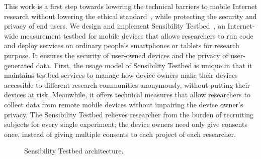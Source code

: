 This work is a first step towards lowering the technical
barriers to mobile Internet research without lowering the
ethical standard~\cite{zevenbergen2013ethical}, while 
protecting the security and privacy of end users. We design 
and implement Sensibility Testbed~\cite{sensibility, 
zhuang2014sensibility}, an Internet-wide measurement testbed for mobile devices that
allows researchers to run code and deploy services on ordinary
people's smartphones or tablets for research purpose. It ensures
the security of user-owned devices and the privacy of
user-generated data. First, the usage model of Sensibility Testbed is
unique in that it maintains testbed services to manage how device 
owners make their devices accessible to different research 
communities anonymously, without putting
their devices at risk. Meanwhile, it offers technical measures
that allow researchers to collect data from remote mobile
devices without impairing the device owner's privacy. The
Sensibility Testbed relieves researcher from the burden of
recruiting subjects for every single experiment; the device
owners need only give consents once, instead of giving multiple
consents to each project of each researcher.

\begin{figure}
\caption{\small Sensibility Testbed architecture. 
\label{fig-arch}}
\end{figure}

